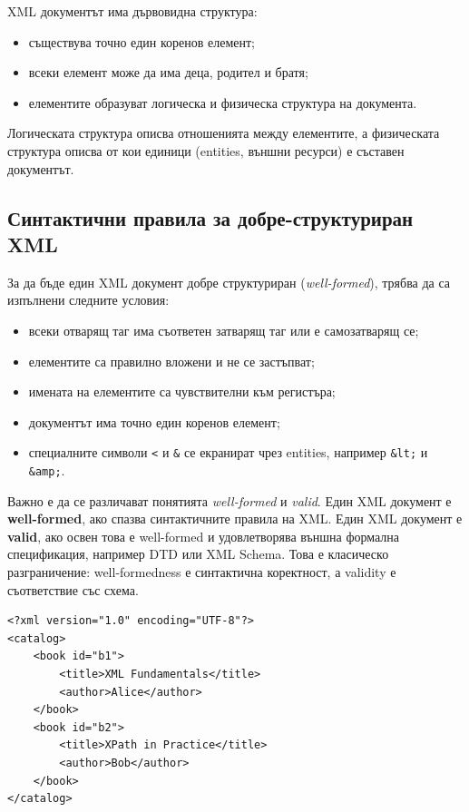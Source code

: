 \documentclass{scrartcl}
\begin{document}
\begin{FlushLeft}
XML документът има дървовидна структура:

\begin{itemize}
    \item съществува точно един коренов елемент;
    \item всеки елемент може да има деца, родител и братя;
    \item елементите образуват логическа и физическа структура на документа.
\end{itemize}

Логическата структура описва отношенията между елементите, а физическата структура описва от кои единици (entities, външни ресурси) е съставен документът.

\subsection{Синтактични правила за добре-структуриран XML}

За да бъде един XML документ добре структуриран (\textit{well-formed}), трябва да са изпълнени следните условия:

\begin{itemize}
    \item всеки отварящ таг има съответен затварящ таг или е самозатварящ се;
    \item елементите са правилно вложени и не се застъпват;
    \item имената на елементите са чувствителни към регистъра;
    \item документът има точно един коренов елемент;
    \item специалните символи \texttt{<} и \texttt{\&} се екранират чрез entities, например \texttt{\&lt;} и \texttt{\&amp;}.
\end{itemize}

Важно е да се различават понятията \textit{well-formed} и \textit{valid}. Един XML документ е \textbf{well-formed}, ако спазва синтактичните правила на XML. Един XML документ е \textbf{valid}, ако освен това е well-formed и удовлетворява външна формална спецификация, например DTD или XML Schema. Това е класическо разграничение: well-formedness е синтактична коректност, а validity е съответствие със схема.

\begin{lstlisting}[caption=Well-formed XML example]
<?xml version="1.0" encoding="UTF-8"?>
<catalog>
    <book id="b1">
        <title>XML Fundamentals</title>
        <author>Alice</author>
    </book>
    <book id="b2">
        <title>XPath in Practice</title>
        <author>Bob</author>
    </book>
</catalog>
\end{lstlisting}


\end{FlushLeft}
\end{document}
